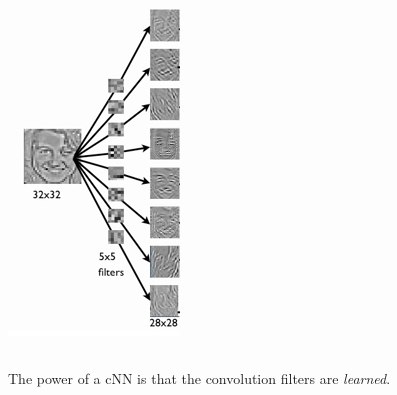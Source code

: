 \documentclass[USenglish,pdftex,compress,10pt,svgnamesi,handout]{beamer}
\begin{document}
\begin{frame}
\begin{columns}
\begin{column}{0.25\textwidth}
\includegraphics[width=\textwidth]{convol}
\end{column}
\end{columns}
The power of a cNN is that the convolution filters are \textsl{learned}.

\end{frame}
\end{document}
